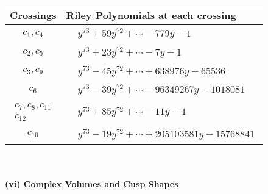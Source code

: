 \documentclass[1p]{elsarticle_modified}
\theoremstyle{definition}
\begin{document}
\begin{tabular}{m{50pt}|m{274pt}}
Crossings & \hspace{64pt}Riley Polynomials at each crossing \\
\hline $$\begin{aligned}c_{1},c_{4}\end{aligned}$$&$\begin{aligned}
&y^{73}+59 y^{72}+\cdots-779 y-1
\end{aligned}$\\
\hline $$\begin{aligned}c_{2},c_{5}\end{aligned}$$&$\begin{aligned}
&y^{73}+23 y^{72}+\cdots-7 y-1
\end{aligned}$\\
\hline $$\begin{aligned}c_{3},c_{9}\end{aligned}$$&$\begin{aligned}
&y^{73}-45 y^{72}+\cdots+638976 y-65536
\end{aligned}$\\
\hline $$\begin{aligned}c_{6}\end{aligned}$$&$\begin{aligned}
&y^{73}-39 y^{72}+\cdots-96349267 y-1018081
\end{aligned}$\\
\hline $$\begin{aligned}c_{7},c_{8},c_{11}\\c_{12}\end{aligned}$$&$\begin{aligned}
&y^{73}+85 y^{72}+\cdots-11 y-1
\end{aligned}$\\
\hline $$\begin{aligned}c_{10}\end{aligned}$$&$\begin{aligned}
&y^{73}-19 y^{72}+\cdots+205103581 y-15768841
\end{aligned}$\\
\hline
\end{tabular}\\~\\
\newpage\flushleft \textbf{(vi) Complex Volumes and Cusp Shapes}
\end{document}
